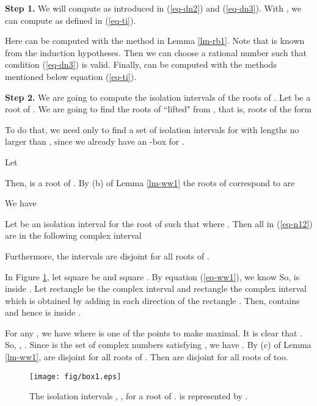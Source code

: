 \documentclass[amsthm]{JSC_LaTex_2007_Mar_12/elsart}
\def\bref#1{(\ref{#1})}
\begin{document}
{\bf Step 1.} We will compute  as introduced in
\bref{eq-dn2} and \bref{eq-dn3}. With , we can compute
 as defined in \bref{eq-ti}.

Here  can be computed with the method in Lemma
\ref{lm-rb1}. Note that  is known from the induction
hypotheses. Then we can choose a rational number  such that
condition \bref{eq-dn3} is valid. Finally,  can be
computed with the methods mentioned below equation \bref{eq-ti}.

{\bf Step 2.} We are going to compute the isolation intervals of the
roots of . Let   be a root of
. We are going to find the roots of  ``lifted"
from , that is, roots of the form

To do that, we need only to find a set of isolation intervals for
 with lengths no larger than , since we
already have an -box for .

Let

Then,  is a root of .
By (b) of Lemma \ref{lm-ww1} the roots  of 
correspond to  are

We have

\begin{lem}\label{lm-rr1}
Let  be an isolation interval for the
root  of  such that 
where . Then all  in
\bref{eq-n12} are in the following complex interval

Furthermore, the intervals  are disjoint for all
roots  of .
\end{lem}
\begin{pf}
In Figure \ref{fig-box1}, let square  be  and  square
.
By equation \bref{eq-ww1}, we know  So,  is inside .
Let rectangle  be the complex interval  and
rectangle  the complex interval 
which is obtained by adding  in each direction of the
rectangle .
Then,  contains  and hence
 is inside .

For any , we have  where  is one of the points  to make
 maximal. It is clear that . So, ,
. Since 
is the set of complex numbers satisfying ,
we have .
By (c) of Lemma \ref{lm-ww1},  are disjoint for
all roots of . Then   are disjoint for
all roots of  too.
\end{pf}

\begin{figure}[ht]
\centering
\begin{minipage}{0.7\textwidth}
\centering
 \texttt{[image: fig/box1.eps]}
 \caption{The isolation intervals , ,  for a root  of .
  is represented by .}
\label{fig-box1}
\end{minipage}
\end{figure}
\end{document}
